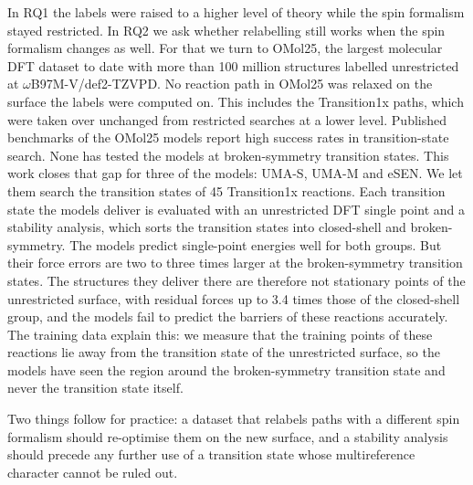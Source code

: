 In RQ1 the labels were raised to a higher level of theory while the
spin formalism stayed restricted. In RQ2 we ask whether relabelling still
works when the spin formalism changes as well. For that we turn to OMol25, the
largest molecular DFT dataset to date with more than 100 million
structures labelled unrestricted at \mbox{$\omega$B97M-V/def2-TZVPD}.
No reaction path in OMol25 was relaxed on the surface the labels were
computed on. This includes the Transition1x paths, which were taken
over unchanged from restricted searches at a lower level. Published
benchmarks of the OMol25 models report high success rates in
transition-state search. None has tested the models at
broken-symmetry transition states. This work closes that gap for three
of the models: UMA-S, UMA-M and eSEN. We let them search the
transition states of 45 Transition1x reactions. Each transition state
the models deliver is evaluated with an unrestricted
DFT single point and a stability analysis, which sorts the transition
states into closed-shell and broken-symmetry. The models predict single-point energies well for both groups. But
their force errors are two to three times larger at the
broken-symmetry transition states. The structures they deliver there
are therefore not stationary points of the unrestricted surface, with
residual forces up to 3.4 times those of the closed-shell group, and
the models fail to predict the barriers of these reactions
accurately. The training data explain this: we measure that the training points
of these reactions lie away from the transition state of the
unrestricted surface, so the models have seen the region around the
broken-symmetry transition state and never the transition state
itself.

Two things follow for practice: a dataset that relabels paths with a
different spin formalism should re-optimise them on the new surface, and a stability
analysis should precede any further use of a transition state whose
multireference character cannot be ruled out.
